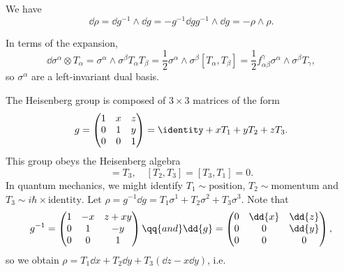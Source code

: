 \documentclass{jknotes}
\begin{document}
We have
\begin{equation}
    \dd{\rho} = \dd{g^{-1}}\wedge\dd{g} = -g^{-1}\dd{g}g^{-1}\wedge\dd{g} = -\rho\wedge\rho.
\end{equation}

In terms of the expansion,
\begin{equation}
    \dd{\sigma^\alpha}\otimes T_\alpha = \sigma^\alpha\wedge\sigma^\beta T_\alpha T_\beta = \frac{1}{2}\sigma^\alpha\wedge\sigma^\beta[T_\alpha,T_\beta] = \frac{1}{2}f^\gamma_{\alpha\beta} \sigma^\alpha\wedge\sigma^\beta T_\gamma,
\end{equation}
so \(\sigma^\alpha\) are a left-invariant dual basis.

\begin{eg}
    The Heisenberg group is composed of \(3\times3\) matrices of the form
    \begin{equation}
        g = 
        \begin{pmatrix}
            1 & x & z \\
            0 & 1 & y \\
            0 & 0 & 1
        \end{pmatrix}
        = \identity + xT_1 + yT_2 + zT_3.
    \end{equation}
    This group obeys the Heisenberg algebra
    \begin{equation}
        [T_1,T_2] = T_3,\quad [T_2,T_3] = [T_3,T_1] = 0.
    \end{equation}
    In quantum mechanics, we might identify \(T_1 \sim \text{position}\), \(T_2 \sim \text{momentum}\) and \(T_3 \sim i\hbar\times\text{identity}\). Let \(\rho = g^{-1}\dd{g} = T_1\sigma^1 + T_2\sigma^2 + T_3\sigma^3\). Note that
    \begin{equation}
        g^{-1} = 
        \begin{pmatrix}
            1 & -x & z+xy \\
            0 & 1 & -y \\
            0 & 0 & 1
        \end{pmatrix}
        \qq{and}
        \dd{g} =
        \begin{pmatrix}
            0 & \dd{x} & \dd{z} \\
            0 & 0 & \dd{y} \\
            0 & 0 & 0
        \end{pmatrix},
    \end{equation}
    so we obtain \(\rho = T_1\dd{x} + T_2\dd{y} + T_3(\dd{z}-x\dd{y})\), i.e.\ 
    \begin{equation}

\end{equation}
\end{eg}
\end{document}
